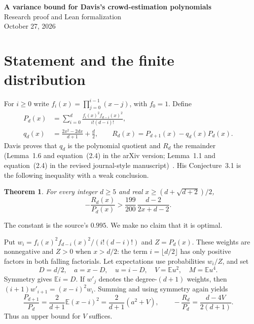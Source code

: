 \documentclass[11pt]{article}
\newtheorem{theorem}{Theorem}
\newcommand{\E}{\mathbb E}
\begin{document}
\begin{center}
{\Large\bfseries A variance bound for Davis's crowd-estimation polynomials}\\[.5em]
Research proof and Lean formalization\\
October 27, 2026
\end{center}
\begin{abstract}
We prove the rational-function bound proposed in Conjecture~3.1 of Davis's
paper on crowd estimation. The inequality holds strictly throughout its
stated domain. The proof rewrites the polynomial quotient as a variance,
derives an exact fourth-moment identity by finite detailed balance, and
uses a quadratic comparison for every integer degree at least~43.
The remaining~38 degrees are covered by exact positive-coefficient
certificates. The source's separate conjecture on critical points is
not addressed. Independent review and final packet acceptance are pending.
\end{abstract}

\section{Statement and the finite distribution}
For $i\ge0$ write $f_i(x)=\prod_{j=0}^{i-1}(x-j)$, with $f_0=1$. Define
\begin{align}
 P_d(x)&=\sum_{i=0}^d\frac{f_i(x)^2f_{d-i}(x)^2}{i!(d-i)!},\label{Pd}\\
 q_d(x)&=\frac{2x^2-2dx}{d+1}+\frac d2,
 \qquad R_d(x)=P_{d+1}(x)-q_d(x)P_d(x).\label{remainder}
\end{align}
Davis proves that $q_d$ is the polynomial quotient and $R_d$ the remainder
(Lemma~1.6 and equation~(2.4) in the arXiv version; Lemma~1.1 and
equation~(2.4) in the revised journal-style manuscript)~\cite{Davis}.
His Conjecture~3.1 is the following inequality with a weak conclusion.
\begin{theorem}\label{main}
For every integer $d\ge5$ and real $x\ge(d+\sqrt{d+2})/2$,
\[
 -\frac{R_d(x)}{P_d(x)}>
 \frac{199}{200}\,\frac{d-2}{2x+d-2}.
\]
\end{theorem}
The constant is the source's $0.995$. We make no claim that it is optimal.

Put $w_i=f_i(x)^2f_{d-i}(x)^2/(i!(d-i)!)$ and $Z=P_d(x)$.
These weights are nonnegative and $Z>0$ when $x>d/2$: the term
$i=\lfloor d/2\rfloor$ has only positive factors in both falling
factorials. Let expectations use probabilities $w_i/Z$, and set
\[
 D=d/2,\quad a=x-D,\quad u=i-D,\quad V=\E u^2,\quad M=\E u^4.
\]
Symmetry gives $\E i=D$. If $w'_j$ denotes the degree-$(d+1)$ weights,
then $(i+1)w'_{i+1}=(x-i)^2w_i$. Summing and using symmetry again yields
\begin{equation}\label{variance}
 \frac{P_{d+1}}{P_d}=\frac{2}{d+1}\E(x-i)^2
 =\frac{2}{d+1}(a^2+V),\qquad
 -\frac{R_d}{P_d}=\frac{d-4V}{2(d+1)}.
\end{equation}
Thus an upper bound for $V$ suffices.
\end{document}
